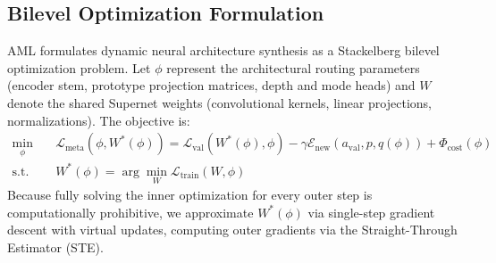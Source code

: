 \documentclass[11pt, a4paper]{article}
\begin{document}
\subsection{Bilevel Optimization Formulation}

AML formulates dynamic neural architecture synthesis as a Stackelberg bilevel optimization problem. Let $\phi$ represent the architectural routing parameters (encoder stem, prototype projection matrices, depth and mode heads) and $W$ denote the shared Supernet weights (convolutional kernels, linear projections, normalizations). The objective is:
\begin{align}
    \min_{\phi} \quad & \mathcal{L}_{\text{meta}}(\phi, W^*(\phi)) = \mathcal{L}_{\text{val}}(W^*(\phi), \phi) - \gamma \mathcal{E}_{\text{new}}(a_{\text{val}}, p, q(\phi)) + \Phi_{\text{cost}}(\phi) \\
    \text{s.t.} \quad & W^*(\phi) = \arg\min_{W} \mathcal{L}_{\text{train}}(W, \phi)
\end{align}
Because fully solving the inner optimization for every outer step is computationally prohibitive, we approximate $W^*(\phi)$ via single-step gradient descent with virtual updates, computing outer gradients via the Straight-Through Estimator (STE).
\end{document}
